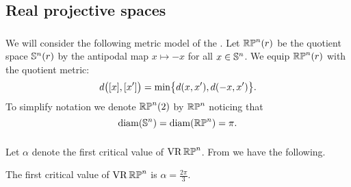 \subsection{Real projective spaces}\label{sub:first_critical_value_rpn}

\subsubsection{}

We will consider the following metric model of the .
Let $\rp^n(r)$ be the quotient space $\bS^n(r)$ by the antipodal map $x \mapsto -x$ for all $x \in \bS^n$.
We equip $\rp^n(r)$ with the quotient metric:
\[
d\big([x],[x']\big) =
\min\set[\big]{d(x, x'), d(-x, x')}.
\]
To simplify notation we denote $\rp^n(2)$ by $\rp^n$ noticing that
\[
\diam(\bS^n) = \diam(\rp^n) = \pi.
\]

\subsubsection{}

Let \(\alpha\) denote the first critical value of \(\VR\rp^n\).
From \cite[Thm.~4.5]{adams2022metric} we have the following.

\medskip\proposition
The first critical value of \(\VR\rp^n\) is \(\alpha = \frac{2\pi}{3}\).
%




%

\subsubsection{}\label{subsub:beta_m_rpn}


